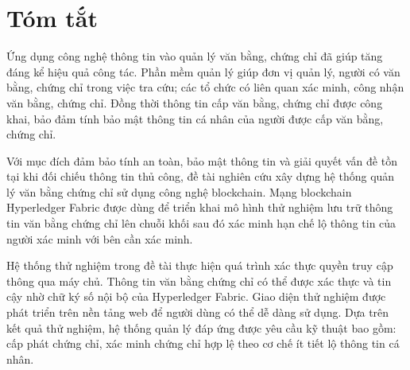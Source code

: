 \chapter*{Tóm tắt}
Ứng dụng công nghệ thông tin vào quản lý văn bằng, chứng chỉ đã giúp tăng đáng kể hiệu quả công tác. Phần mềm quản lý giúp đơn vị quản lý, người có văn bằng, chứng chỉ trong việc tra cứu; các tổ chức có liên quan xác minh, công nhận văn bằng, chứng chỉ. Đồng thời thông tin cấp văn bằng, chứng chỉ được công khai, bảo đảm tính bảo mật thông tin cá nhân của người được cấp văn bằng, chứng chỉ. 

Với mục đích đảm bảo tính an toàn, bảo mật thông tin và giải quyết vấn đề tồn tại khi đối chiếu thông tin thủ công, đề tài nghiên cứu xây dựng hệ thống quản lý văn bằng chứng chỉ sử dụng công nghệ blockchain. Mạng blockchain Hyperledger Fabric được dùng để triển khai mô hình thử nghiệm lưu trữ thông tin văn bằng chứng chỉ lên chuỗi khối sau đó xác minh hạn chế lộ thông tin của người xác minh với bên cần xác minh.

Hệ thống thử nghiệm trong đề tài thực hiện quá trình xác thực quyền truy cập thông qua máy chủ. Thông tin văn bằng chứng chỉ có thể được xác thực và tin cậy nhờ chữ ký số nội bộ của Hyperledger Fabric. Giao diện thử nghiệm được phát triển trên nền tảng web để người dùng có thể dễ dàng sử dụng. Dựa trên kết quả thử nghiệm, hệ thống quản lý đáp ứng được yêu cầu kỹ thuật bao gồm: cấp phát chứng chỉ, xác minh chứng chỉ hợp lệ theo cơ chế ít tiết lộ thông tin cá nhân.
